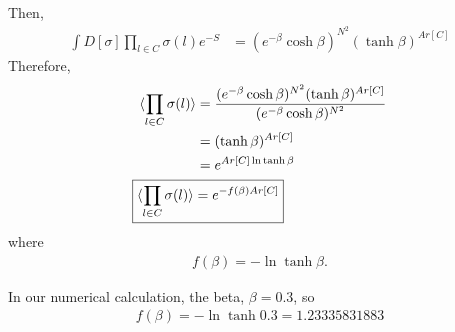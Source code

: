 \documentclass[]{article}
\numberwithin{equation}{section}
\begin{document}
Then,
\begin{align}
    \int D[\sigma]\prod_{l\in C}\sigma(l)e^{-S}&=(e^{-\beta}\cosh{\beta})^{N^2}(\tanh{\beta})^{Ar[C]}
\end{align}
Therefore,
\begin{align}
    \braket{\prod_{l\in C} \sigma(l)}&=\frac{(e^{-\beta}\cosh{\beta})^{N^2}(\tanh{\beta})^{Ar[C]}}{(e^{-\beta}\cosh{\beta})^{N^2}}\\
    &=(\tanh{\beta})^{Ar[C]}\\
    &=e^{Ar[C]\ln{\tanh{\beta}}}\\
    \Aboxed{\braket{\prod_{l\in C} \sigma(l)}&=e^{-f(\beta)Ar[C]}}
\end{align}
where
\begin{align}
    f(\beta)=-\ln{\tanh{\beta}}.
\end{align}


In our numerical calculation, the beta, $\beta=0.3$, so
\begin{align}
    f(\beta)=-\ln{\tanh{0.3}}=1.23335831883
\end{align}
\end{document}
